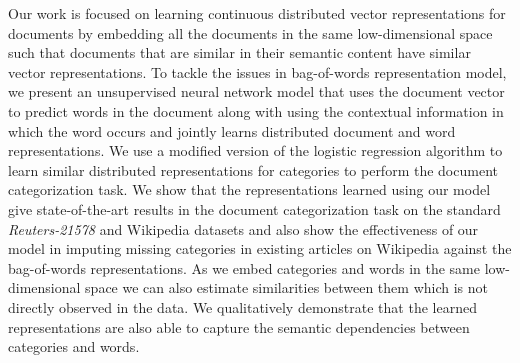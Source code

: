 Our work is focused on learning continuous distributed vector representations for documents by embedding all the documents in the same low-dimensional space such that documents that are similar in their semantic content have similar vector representations. To tackle the issues in bag-of-words representation model, we present an unsupervised neural network model that uses the document vector to predict words in the document along with using the contextual information in which the word occurs and jointly learns distributed document and word representations. We use a modified version of the logistic regression algorithm to learn similar distributed representations for categories to perform the document categorization task. We show that the representations learned using our model give state-of-the-art results in the document categorization task on the standard \emph{Reuters-21578} and Wikipedia datasets and also show the effectiveness of our model in imputing missing categories in existing articles on Wikipedia against the bag-of-words representations. As we embed categories and words in the same low-dimensional space we can also estimate similarities between them which is not directly observed in the data. We qualitatively demonstrate that the learned representations are also able to capture the semantic dependencies between categories and words. 